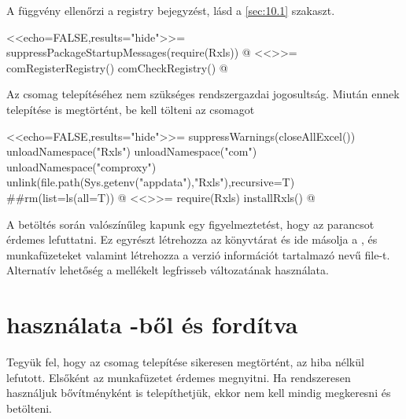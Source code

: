 A  függvény ellenőrzi a registry bejegyzést,
lásd a \ref{sec:10.1} szakaszt.
\begin{Rnw}
<<echo=FALSE,results="hide">>=
suppressPackageStartupMessages(require(Rxls))
@ 
<<>>=
comRegisterRegistry()
comCheckRegistry()
@ 
\end{Rnw}
Az  csomag telepítéséhez nem szükséges rendszergazdai
jogosultság.
Miután ennek telepítése is megtörtént, be kell tölteni az 
csomagot
\begin{Rnw}
<<echo=FALSE,results="hide">>=
suppressWarnings(closeAllExcel())
unloadNamespace("Rxls")
unloadNamespace("com")
unloadNamespace("comproxy")
unlink(file.path(Sys.getenv("appdata"),"Rxls"),recursive=T)
##rm(list=ls(all=T))
@ 
<<>>=
require(Rxls)
installRxls()
@   
\end{Rnw}
A betöltés során valószínűleg kapunk egy figyelmeztetést, hogy az
 parancsot érdemes lefuttatni. Ez egyrészt létrehozza
az  könyvtárat és ide másolja
a ,  és  munkafüzeteket
valamint létrehozza a verzió információt tartalmazó  nevű file-t.
Alternatív lehetőség a mellékelt 
legfrisseb változatának használata.

\section{ használata -ből és fordítva}
\label{sec:1.2}

Tegyük fel, hogy az  csomag telepítése sikeresen
megtörtént, az  hiba nélkül 
lefutott. Elsőként az  munkafüzetet érdemes
megnyitni. Ha rendszeresen használjuk bővítményként is telepíthetjük,
ekkor nem kell mindig megkeresni és betölteni. 

